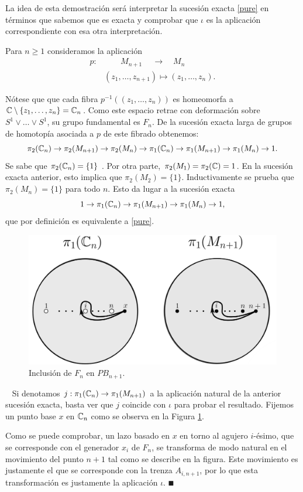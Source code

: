 \documentclass[TFG.tex]{subfiles}
\begin{document}
\begin{dem}
La idea de esta demostración será interpretar la sucesión exacta \ref{pure} en términos que sabemos que es exacta y comprobar que $\iota$ es la aplicación correspondiente con esa otra interpretación.

Para $n\geq 1$ consideramos la aplicación
\begin{align}\label{fibrado}
p: & \qquad M_{n+1}\ \quad \longrightarrow\quad M_n\\
&(z_1,\dots,z_{n+1})\mapsto (z_1,\dots,z_n).\nonumber
\end{align} 

Nótese que que cada fibra $p^{-1}((z_1,\dots, z_n))$ es homeomorfa a $\mathbb{C}\setminus\{z_1,\dots, z_n\}=\mathbb{C}_n$. Como este espacio retrae con deformación sobre $S^1\lor\dots\lor S^1$, su grupo fundamental es $F_n$. De la sucesión exacta larga de grupos de homotopía asociada a $p$ \cite{Hatcher} de este fibrado obtenemos:
$$\pi_2(\mathbb{C}_n)\to\pi_2(M_{n+1})\to\pi_2(M_n)\to\pi_1(\mathbb{C}_n)\to\pi_1(M_{n+1})\to\pi_1(M_n)\to 1.$$
Se sabe que $\pi_2(\mathbb{C}_n)=\{1\}$ \cite{Hatcher}. Por otra parte, $\pi_2(M_1)=\pi_2(\mathbb{C})={1}$. En la sucesión exacta anterior, esto implica que $\pi_2(M_2)=\{1\}$. Inductivamente se prueba que $\pi_2(M_n)=\{1\}$ para todo $n$. Esto da lugar a la sucesión exacta
$$1\to\pi_1(\mathbb{C}_n)\to\pi_1(M_{n+1})\to\pi_1(M_n)\to 1,$$
que por definición es equivalente a \ref{pure}. 


\begin{figure}[h!]
\includegraphics[scale=0.4]{Imagenes/inclusion.png}
\caption{Inclusión de $F_n$ en $PB_{n+1}$.}\label{inclusion}
\end{figure}\
Si denotamos $j:\pi_1(\mathbb{C}_n)\to\pi_1(M_{n+1})$ a la aplicación natural de la anterior sucesión exacta, basta ver que $j$ coincide con $\iota$ para probar el resultado. Fijemos un punto base $x$ en $\mathbb{C}_n$ como se observa en la Figura \ref{inclusion}.

Como se puede comprobar, un lazo basado en $x$ en torno al agujero $i$-ésimo, que se corresponde con el generador $x_i$ de $F_n$, se transforma de modo natural en el movimiento del punto $n+1$ tal como se describe en la figura. Este movimiento es justamente el que se corresponde con la trenza $A_{i,n+1}$, por lo que esta transformación es justamente la aplicación $\iota$. $\QED$
\end{dem}
\end{document}

